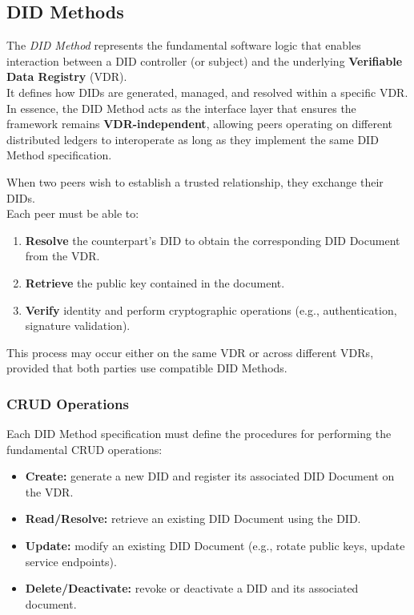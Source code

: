 \subsection{DID Methods}

The \textit{DID Method} represents the fundamental software logic that enables interaction between a DID controller (or subject) and the underlying \textbf{Verifiable Data Registry} (VDR).\\ 
It defines how DIDs are generated, managed, and resolved within a specific VDR.\\
In essence, the DID Method acts as the interface layer that ensures the framework remains \textbf{VDR-independent}, allowing peers operating on different distributed ledgers to interoperate as long as they implement the same DID Method specification.

\bigskip

\noindent
When two peers wish to establish a trusted relationship, they exchange their DIDs.\\  
Each peer must be able to:
\begin{enumerate}
    \item \textbf{Resolve} the counterpart’s DID to obtain the corresponding DID Document from the VDR.
    \item \textbf{Retrieve} the public key contained in the document.
    \item \textbf{Verify} identity and perform cryptographic operations (e.g., authentication, signature validation).
\end{enumerate}
This process may occur either on the same VDR or across different VDRs, provided that both parties use compatible DID Methods.

\subsubsection{CRUD Operations}
Each DID Method specification must define the procedures for performing the fundamental CRUD operations:
\begin{itemize}
    \item \textbf{Create:} generate a new DID and register its associated DID Document on the VDR.
    \item \textbf{Read/Resolve:} retrieve an existing DID Document using the DID.
    \item \textbf{Update:} modify an existing DID Document (e.g., rotate public keys, update service endpoints).
    \item \textbf{Delete/Deactivate:} revoke or deactivate a DID and its associated document.
\end{itemize}

